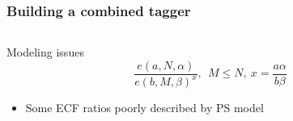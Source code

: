 \documentclass[aspectratio=169,xcolor=dvipsnames,,table,compress]{beamer}
\begin{document}
\begin{frame}[t] \frametitle{Building a combined tagger}
  \vspace{-5mm}
  \begin{columns}[T]
  \begin{column}{0.33\textwidth}
  \centering 
    Modeling issues 
    \vspace{-2mm}
    \[{\displaystyle \frac{e(a,N,\alpha)}{e(b,M,\beta)^x},~~ M \leq N, ~ x = \frac{a\alpha}{b\beta} }\] 
    \vspace{-4mm}
    \begin{itemize}
      \item {\small Some ECF ratios poorly described by PS model}
    \end{itemize}

\end{column}
\end{columns}
\end{frame}
\end{document}
